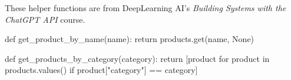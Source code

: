 \documentclass[
  letterpaper,
  DIV=11,
  numbers=noendperiod]{scrreprt}
\newenvironment{Shaded}{\begin{snugshade}}{\end{snugshade}}
\newcommand{\ControlFlowTok}[1]{\textcolor[rgb]{0.00,0.23,0.31}{#1}}
\newcommand{\KeywordTok}[1]{\textcolor[rgb]{0.00,0.23,0.31}{#1}}
\newcommand{\NormalTok}[1]{\textcolor[rgb]{0.00,0.23,0.31}{#1}}
\newcommand{\OperatorTok}[1]{\textcolor[rgb]{0.37,0.37,0.37}{#1}}
\newcommand{\StringTok}[1]{\textcolor[rgb]{0.13,0.47,0.30}{#1}}
\newcommand{\VariableTok}[1]{\textcolor[rgb]{0.07,0.07,0.07}{#1}}
\begin{document}
These helper functions are from DeepLearning AI's \emph{Building Systems
with the ChatGPT API} course.

\begin{Shaded}
\begin{Highlighting}[]
\KeywordTok{def}\NormalTok{ get\_product\_by\_name(name):}
    \ControlFlowTok{return}\NormalTok{ products.get(name, }\VariableTok{None}\NormalTok{)}

\KeywordTok{def}\NormalTok{ get\_products\_by\_category(category):}
    \ControlFlowTok{return}\NormalTok{ [product }\ControlFlowTok{for}\NormalTok{ product }\KeywordTok{in}\NormalTok{ products.values() }\ControlFlowTok{if}\NormalTok{ product[}\StringTok{"category"}\NormalTok{] }\OperatorTok{==}\NormalTok{ category]}
\end{Highlighting}
\end{Shaded}
\end{document}
